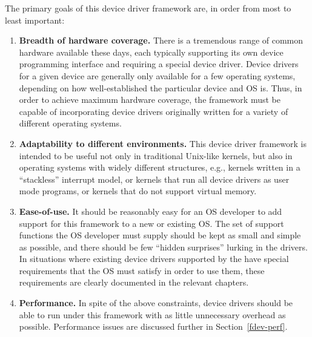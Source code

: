 The primary goals of this device driver framework are,
in order from most to least important:
\begin{enumerate}
\item	{\bf Breadth of hardware coverage.}
	There is a tremendous range of common hardware available these days,
	each typically supporting its own device programming interface
	and requiring a special device driver.
	Device drivers for a given device
	are generally only available for a few operating systems,
	depending on how well-established the particular device and OS is.
	Thus, in order to achieve maximum hardware coverage,
	the framework must be capable of incorporating device drivers
	originally written for a variety of different operating systems.

\item	{\bf Adaptability to different environments.}
	This device driver framework is intended to be useful
	not only in traditional Unix-like kernels,
	but also in operating systems with widely different structures,
	e.g., kernels written in a ``stackless'' interrupt model,
	or kernels that run all device drivers as user mode programs,
	or kernels that do not support virtual memory.

\item	{\bf Ease-of-use.}
	It should be reasonably easy for an OS developer
	to add support for this framework to a new or existing OS\@.
	The set of support functions the OS developer must supply
	should be kept as small and simple as possible,
	and there should be few ``hidden surprises'' lurking in the drivers.
	In situations where existing device drivers supported by the \oskit{}
	have special requirements that the OS must satisfy in order to use them,
	these requirements are clearly documented in the relevant chapters.

\item	{\bf Performance.}
	In spite of the above constraints,
	device drivers should be able to run under this framework
	with as little unnecessary overhead as possible.
	Performance issues are discussed further in Section~\ref{fdev-perf}.
\end{enumerate}

